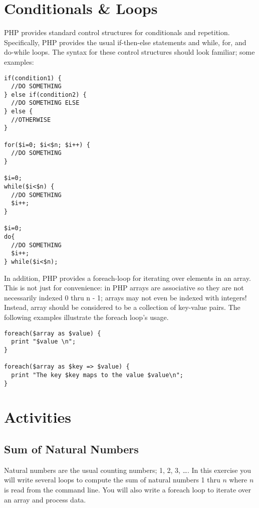 \documentclass[12pt]{scrartcl}
\begin{document}
\section*{Conditionals \& Loops}

PHP provides standard control structures for conditionals and repetition.  Specifically, PHP provides the usual if-then-else statements and while, for, and do-while loops.  The syntax for these control structures should look familiar; some examples:

\begin{verbatim}
if(condition1) {
  //DO SOMETHING
} else if(condition2) {
  //DO SOMETHING ELSE
} else {
  //OTHERWISE
}

for($i=0; $i<$n; $i++) {
  //DO SOMETHING
}

$i=0;
while($i<$n) {
  //DO SOMETHING
  $i++;
}

$i=0;
do{ 
  //DO SOMETHING
  $i++;
} while($i<$n);
\end{verbatim}

In addition, PHP provides a foreach-loop for iterating over elements in 
an array.  This is not just for convenience: in PHP arrays are associative 
so they are not necessarily indexed 0 thru n - 1; arrays may not even 
be indexed with integers!  Instead, array should be considered to be a
collection of key-value pairs.  The following examples illustrate the 
foreach loop's usage.

\begin{verbatim}
foreach($array as $value) {
  print "$value \n";
}

foreach($array as $key => $value) {
  print "The key $key maps to the value $value\n";
}
\end{verbatim}

\section*{Activities}

\subsection*{Sum of Natural Numbers}

Natural numbers are the usual counting numbers; 1, 2, 3, \ldots.  In 
this exercise you will write several loops to compute the sum of 
natural numbers 1 thru $n$ where $n$ is read from the command line.  
You will also write a foreach loop to iterate over an array and 
process data.
\end{document}
